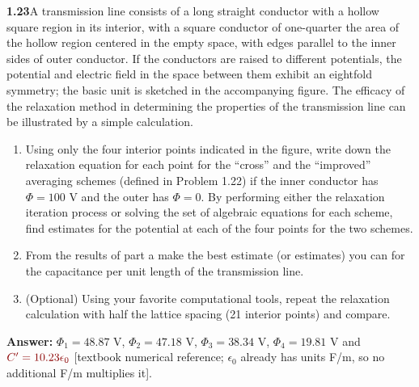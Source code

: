 \par\bigskip
\noindent\textbf{1.23}\quad A transmission line consists of a long straight conductor with a hollow square region in its interior, with a square conductor of one-quarter the area of the hollow region centered in the empty space, with edges parallel to the inner sides of outer conductor. If the conductors are raised to different potentials, the potential and electric field in the space between them exhibit an eightfold symmetry; the basic unit is sketched in the accompanying figure. The efficacy of the relaxation method in determining the properties of the transmission line can be illustrated by a simple calculation.
\begin{enumerate}
\item[(a)] Using only the four interior points indicated in the figure, write down the relaxation equation for each point for the ``cross'' and the ``improved'' averaging schemes (defined in Problem 1.22) if the inner conductor has $\Phi=100$ V and the outer has $\Phi=0$. By performing either the relaxation iteration process or solving the set of algebraic equations for each scheme, find estimates for the potential at each of the four points for the two schemes.
\item[(b)] From the results of part a make the best estimate (or estimates) you can for the capacitance per unit length of the transmission line.
\item[(c)] (Optional) Using your favorite computational tools, repeat the relaxation calculation with half the lattice spacing (21 interior points) and compare.
\end{enumerate}

\textbf{Answer:} $\Phi_{1}=48.87$ V, $\Phi_{2}=47.18$ V, $\Phi_{3}=38.34$ V, $\Phi_{4}=19.81$ V and $\erratum{C'=10.23\epsilon_0}$ [textbook numerical reference;
$\epsilon_0$ already has units F/m, so no additional F/m multiplies it].

